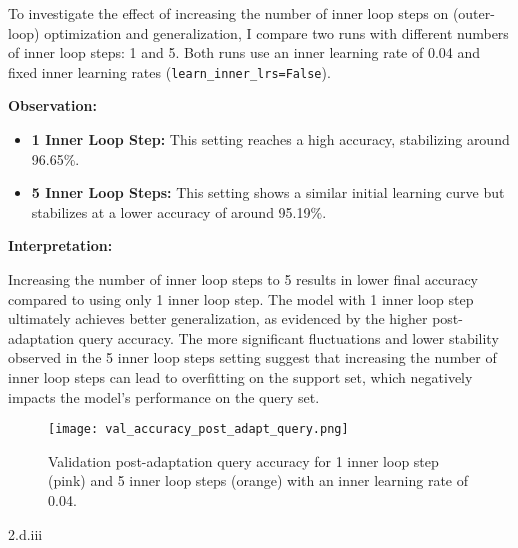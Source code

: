 \begin{answer}
To investigate the effect of increasing the number of inner loop steps on (outer-loop) optimization and generalization, I compare two runs with different numbers of inner loop steps: 1 and 5. Both runs use an inner learning rate of 0.04 and fixed inner learning rates (\texttt{learn\_inner\_lrs=False}). 

\textbf{Observation:}

\begin{itemize}
    \item \textbf{1 Inner Loop Step:} This setting reaches a high accuracy, stabilizing around 96.65\%.
    \item \textbf{5 Inner Loop Steps:} This setting shows a similar initial learning curve but stabilizes at a lower accuracy of around 95.19\%.
\end{itemize}

\textbf{Interpretation:}

Increasing the number of inner loop steps to 5 results in lower final accuracy compared to using only 1 inner loop step. The model with 1 inner loop step ultimately achieves better generalization, as evidenced by the higher post-adaptation query accuracy. The more significant fluctuations and lower stability observed in the 5 inner loop steps setting suggest that increasing the number of inner loop steps can lead to overfitting on the support set, which negatively impacts the model's performance on the query set.

\begin{figure}[H]
    \centering
    \texttt{[image: val\_accuracy\_post\_adapt\_query.png]}
    \caption{Validation post-adaptation query accuracy for 1 inner loop step (pink) and 5 inner loop steps (orange) with an inner learning rate of 0.04.}
\end{figure}
\end{answer}

\LARGE
2.d.iii
\normalsize

